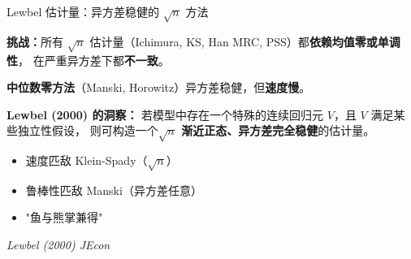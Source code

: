 \documentclass[aspectratio=169, 10pt]{beamer}
\begin{document}
\begin{frame}{Lewbel 估计量：异方差稳健的 $\sqrt{n}$ 方法}

  \textbf{挑战：}所有 $\sqrt{n}$ 估计量（Ichimura, KS, Han MRC, PSS）都\textbf{依赖均值零或单调性}，
  在严重异方差下都\textbf{不一致}。

  \textbf{中位数零方法}（Manski, Horowitz）异方差稳健，但\textbf{速度慢}。

  \begin{keybox}
    \textbf{Lewbel (2000) 的洞察：}
    若模型中存在一个特殊的连续回归元 $V$，且 $V$ 满足某些独立性假设，
    则可构造一个\textbf{$\sqrt{n}$ 渐近正态、异方差完全稳健}的估计量。
    \begin{itemize}\setlength{\itemsep}{1pt}
      \item 速度匹敌 Klein-Spady（$\sqrt{n}$）
      \item 鲁棒性匹敌 Manski（异方差任意）
      \item "鱼与熊掌兼得"
    \end{itemize}
  \end{keybox}

  \hfill{\scriptsize\textit{Lewbel (2000) JEcon}}

\end{frame}
\end{document}

